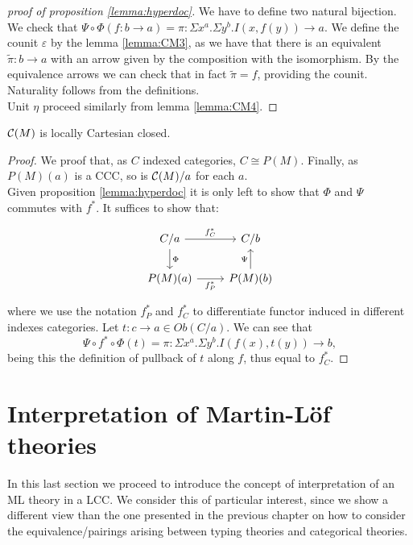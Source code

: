 \begin{proof}[proof of proposition \ref{lemma:hyperdoc}]
  We have to define two natural bijection. We check that $\Psi\circ\Phi(f:b\to a) = \pi: \Sigma x^a. \Sigma y^b.I(x,f(y)) \to a$. We define the counit $\varepsilon$ by the lemma \ref{lemma:CM3}, as we have that there is an equivalent $\tilde \pi : b \to a$ with an arrow given by the composition with the isomorphism. By the equivalence arrows we can check that in fact $\tilde \pi = f$, providing the counit. Naturality follows from the definitions.\\

  Unit $\eta$ proceed similarly from lemma \ref{lemma:CM4}.

\end{proof}
\begin{theorem}
  $\mathcal{C}(M)$ is locally Cartesian closed.
\end{theorem}
\begin{proof}
  We proof that, as $C$ indexed categories, $C\cong P(M)$. Finally, as $P(M)(a)$ is a CCC, so is $\mathcal{C}(M)/a$ for each $a$.\\

  Given proposition \ref{lemma:hyperdoc} it is only left to show that $\Phi$ and $\Psi$ commutes with $f^*$. It suffices to show that:
  \[
    \begin{tikzpicture}
      \node {\begin{tikzcd}
          C/a \ar[d,"\Phi"]\ar[r,"f_C^*"] & C/b\\
          P(M)(a)\ar[r,swap,"f_P^*"] &   P(M)(b)\ar[u,"\Psi"]
        \end{tikzcd}};
    \end{tikzpicture}
  \]
  where we use the notation $f_P^*$ and $f_C^*$ to differentiate functor induced in different indexes categories.   Let $t:c\to a \in Ob(C/a)$. We can see that
  $$\Psi\circ f^*\circ \Phi(t) = \pi: \Sigma x^a. \Sigma y^b.I(f(x),t(y)) \to b,$$
  being this the definition of pullback of $t$ along $f$, thus equal to $f_C^*$.
\end{proof}


\section{Interpretation of Martin-L\"of theories}
\label{InterpretationLCC}
In this last section we proceed to introduce the concept of interpretation of an ML theory in a LCC. We consider this of particular interest, since we show a different view than the one presented in the previous chapter on how to consider the equivalence/pairings arising between typing theories and categorical theories.\\

